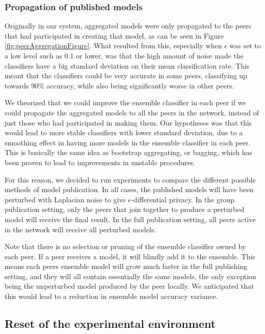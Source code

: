 \subsubsection{Propagation of published models} \label{sec:PropagationPubModel}

Originally in our system, aggregated models were only propagated to the peers that had participated in creating that model, as can be seen in Figure \ref{fig:peerAggregationFigure}. What resulted from this, especially when $\epsilon$ was set to a low level such as 0.1 or lower, was that the high amount of noise made the classifiers have a big standard deviation on their mean classification rate. This meant  that the classifiers could be very accurate in some peers, classifying up towards 90\% accuracy, while also being significantly worse in other peers. 

We theorized that we could improve the ensemble classifier in each peer if we could propagate the aggregated models to all the peers in the network, instead of just those who had participated in making them. Our hypotheses was that this would lead to more stable classifiers with lower standard deviation, due to a smoothing effect in having more models in the ensemble classifier in each peer. This is basically the same idea as bootstrap aggregating, or bagging, which has been proven to lead to improvements in unstable procedures\citep{breiman1996bagging}. 

For this reason, we decided to run experiments to compare the different possible methods of model publication. In all cases, the published models will have been perturbed with Laplacian noise to give $\epsilon$-differential privacy. In the group publication setting, only the peers that join together to produce a perturbed model will receive the final result. In the full publication setting, all peers active in the network will receive all perturbed models. 

Note that there is no selection or pruning of the ensemble classifier owned by each peer. If a peer receives a model, it will blindly add it to the ensemble. This means each peers ensemble model will grow much faster in the full publishing setting, and they will all contain essentially the same models, the only exception being the unperturbed model produced by the peer locally. We anticipated that this would lead to a reduction in ensemble model accuracy variance.


\subsection{Reset of the experimental environment}

